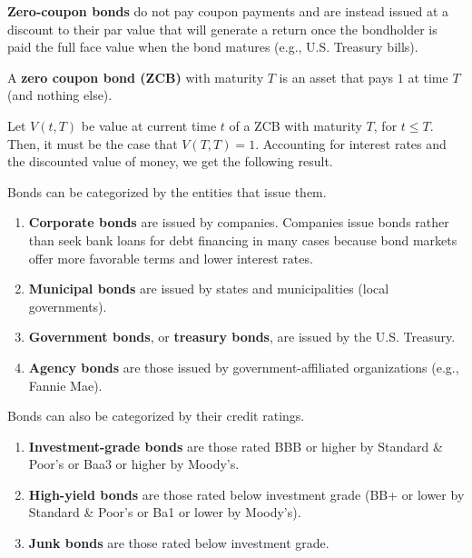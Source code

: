 \documentclass{article}
\begin{document}
    \begin{definition}
      \textbf{Zero-coupon bonds} do not pay coupon payments and are instead issued at a discount to their par value that will generate a return once the bondholder is paid the full face value when the bond matures (e.g., U.S. Treasury bills).
    \end{definition}

    \begin{definition}
      A \textbf{zero coupon bond (ZCB)} with maturity $T$ is an asset that pays $1$ at time $T$ (and nothing else). 
    \end{definition}

    Let $V(t, T)$ be value at current time $t$ of a ZCB with maturity $T$, for $t \leq T$. Then, it must be the case that $V(T, T) = 1$. Accounting for interest rates and the discounted value of money, we get the following result. 


    \begin{definition}
      Bonds can be categorized by the entities that issue them.
      \begin{enumerate}
        \item \textbf{Corporate bonds} are issued by companies. Companies issue bonds rather than seek bank loans for debt financing in many cases because bond markets offer more favorable terms and lower interest rates.
        \item \textbf{Municipal bonds} are issued by states and municipalities (local governments).
        \item \textbf{Government bonds}, or \textbf{treasury bonds}, are issued by the U.S. Treasury.
        \item \textbf{Agency bonds} are those issued by government-affiliated organizations (e.g., Fannie Mae).
      \end{enumerate}
    \end{definition}

    \begin{definition}
      Bonds can also be categorized by their credit ratings. 
      \begin{enumerate}
        \item \textbf{Investment-grade bonds} are those rated BBB or higher by Standard \& Poor's or Baa3 or higher by Moody's. 
        \item \textbf{High-yield bonds} are those rated below investment grade (BB+ or lower by Standard \& Poor's or Ba1 or lower by Moody's). 
        \item \textbf{Junk bonds} are those rated below investment grade. 
      \end{enumerate}
    \end{definition}
\end{document}
